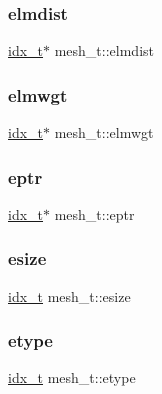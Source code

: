 \subsubsection{\texorpdfstring{elmdist}{elmdist}}
{\footnotesize\ttfamily \hyperlink{a00876_aaa5262be3e700770163401acb0150f52}{idx\+\_\+t}$\ast$ mesh\+\_\+t\+::elmdist}

\mbox{\label{a00738_ace3783c80f252853712db84524c47c4a}} 
\subsubsection{\texorpdfstring{elmwgt}{elmwgt}}
{\footnotesize\ttfamily \hyperlink{a00876_aaa5262be3e700770163401acb0150f52}{idx\+\_\+t}$\ast$ mesh\+\_\+t\+::elmwgt}

\mbox{\label{a00738_abe330de09173a4faac6dbf76f1ae90f8}} 
\subsubsection{\texorpdfstring{eptr}{eptr}}
{\footnotesize\ttfamily \hyperlink{a00876_aaa5262be3e700770163401acb0150f52}{idx\+\_\+t}$\ast$ mesh\+\_\+t\+::eptr}

\mbox{\label{a00738_abec9334407d17d3f681fe82e5f0ae157}} 
\subsubsection{\texorpdfstring{esize}{esize}}
{\footnotesize\ttfamily \hyperlink{a00876_aaa5262be3e700770163401acb0150f52}{idx\+\_\+t} mesh\+\_\+t\+::esize}

\mbox{\label{a00738_a6310e3f72d750dd2f477dc6bbc3d6c1c}} 
\subsubsection{\texorpdfstring{etype}{etype}}
{\footnotesize\ttfamily \hyperlink{a00876_aaa5262be3e700770163401acb0150f52}{idx\+\_\+t} mesh\+\_\+t\+::etype}

